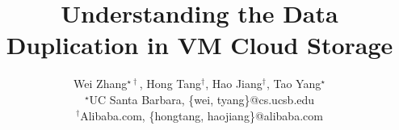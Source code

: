 \documentclass[finalversion]{usetex-v1}
\begin{document}
\title{Understanding the Data Duplication in VM Cloud Storage}
\author{
Wei Zhang$^{\star\dagger}$, Hong Tang$^\dagger$, Hao Jiang$^\dagger$, Tao Yang$^\star$\\
   {\normalsize $^\star$UC Santa Barbara, \{wei, tyang\}@cs.ucsb.edu}\\
   {\normalsize$^\dagger$Alibaba.com, \{hongtang, haojiang\}@alibaba.com}
}
\date{}
\maketitle




%
%
%




{\small


}
\end{document}
